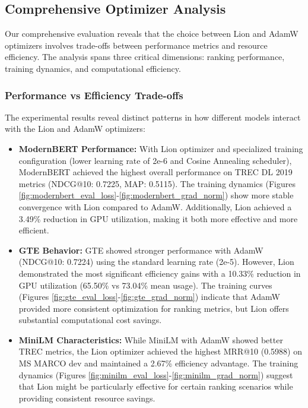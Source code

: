 \subsection{Comprehensive Optimizer Analysis}

Our comprehensive evaluation reveals that the choice between Lion and AdamW optimizers involves trade-offs between performance metrics and resource efficiency. The analysis spans three critical dimensions: ranking performance, training dynamics, and computational efficiency.

\subsubsection{Performance vs Efficiency Trade-offs}

The experimental results reveal distinct patterns in how different models interact with the Lion and AdamW optimizers:

\begin{itemize}
    \item \textbf{ModernBERT Performance:} With Lion optimizer and specialized training configuration (lower learning rate of 2e-6 and Cosine Annealing scheduler), ModernBERT achieved the highest overall performance on TREC DL 2019 metrics (NDCG@10: 0.7225, MAP: 0.5115). The training dynamics (Figures \ref{fig:modernbert_eval_loss}-\ref{fig:modernbert_grad_norm}) show more stable convergence with Lion compared to AdamW. Additionally, Lion achieved a 3.49\% reduction in GPU utilization, making it both more effective and more efficient.
    
    \item \textbf{GTE Behavior:} GTE showed stronger performance with AdamW (NDCG@10: 0.7224) using the standard learning rate (2e-5). However, Lion demonstrated the most significant efficiency gains with a 10.33\% reduction in GPU utilization (65.50\% vs 73.04\% mean usage). The training curves (Figures \ref{fig:gte_eval_loss}-\ref{fig:gte_grad_norm}) indicate that AdamW provided more consistent optimization for ranking metrics, but Lion offers substantial computational cost savings.
    
    \item \textbf{MiniLM Characteristics:} While MiniLM with AdamW showed better TREC metrics, the Lion optimizer achieved the highest MRR@10 (0.5988) on MS MARCO dev and maintained a 2.67\% efficiency advantage. The training dynamics (Figures \ref{fig:minilm_eval_loss}-\ref{fig:minilm_grad_norm}) suggest that Lion might be particularly effective for certain ranking scenarios while providing consistent resource savings.
\end{itemize}

